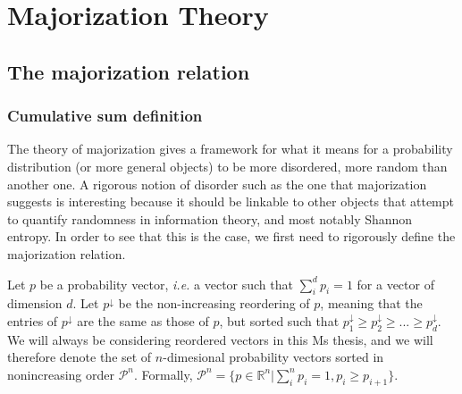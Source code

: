 \chapter{Majorization Theory}



\section{The majorization relation}

\subsection{Cumulative sum definition}

The theory of majorization gives a framework for what it means for a probability distribution (or more general objects) to be more disordered, more random than another one. A rigorous notion of disorder such as the one that majorization suggests is interesting because it should be linkable to other objects that attempt to quantify randomness in information theory, and most notably Shannon entropy. In order to see that this is the case, we first need to rigorously define the majorization relation.

Let $p$ be a probability vector, \textit{i.e.} a vector such that $\sum_{i}^{d} p_i = 1$ for a vector of dimension $d$. Let $p^\downarrow$ be the non-increasing reordering of $p$, meaning that the entries of $p^\downarrow$ are the same as those of $p$, but sorted such that $p^\downarrow_1 \geq p^\downarrow_2 \geq ... \geq p^\downarrow_d$. We will always be considering reordered vectors in this Ms thesis, and we will therefore denote the set of $n$-dimesional probability vectors sorted in nonincreasing order $\mathcal{P}^n$. Formally, $\mathcal{P}^n = \{p \in \mathbb{R}^n | \sum_{i}^{n} p_i = 1, p_i \geq p_{i+1}\}$.

